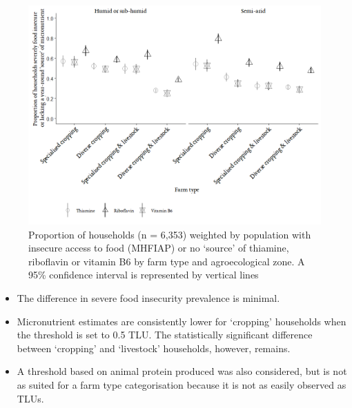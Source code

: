 \begin{figure}[H]
\includegraphics[width=1\textwidth]{Appendix/Ch6_prevalenceOther.png}
    \captionsetup{singlelinecheck = false, justification=justified} %
  \caption{Proportion of households (n = 6,353) weighted by population with insecure access to food (MHFIAP) or no `source' of thiamine, riboflavin or vitamin B6 by farm type and agroecological zone. A 95\% confidence interval is represented by vertical lines}
  \label{fig:A_5}
\end{figure}

\begin{itemize}
\item The difference in severe food insecurity prevalence is minimal.

\item Micronutrient estimates are consistently lower for `cropping' households when the threshold is set to 0.5 TLU. The statistically significant difference between `cropping' and `livestock' households, however, remains.

\item A threshold based on animal protein produced was also considered, but is not as suited for a farm type categorisation because it is not as easily observed as TLUs.

\end{itemize}



